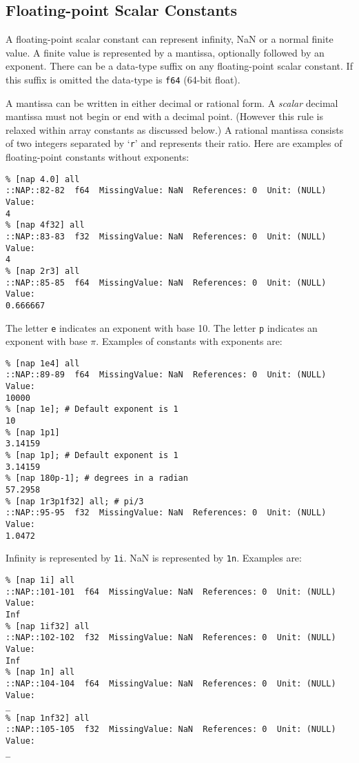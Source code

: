 \subsection{Floating-point Scalar Constants}
      \label{const-Floating-point-Scalar-Constants}

A floating-point scalar constant can represent infinity, NaN or
    a normal finite value. A finite value is represented by a mantissa,
    optionally followed by an exponent. There can be a data-type suffix
    on any floating-point scalar constant. If this suffix is omitted
    the data-type is 
    \texttt{f64} (64-bit float).
    

A mantissa can be written in either decimal or rational form.
    A \emph{scalar} decimal mantissa must not begin or end with a decimal point.
    (However this rule is relaxed within array constants as discussed below.)
    A rational mantissa consists of two integers separated by 
    `\texttt{r}' and represents their ratio. Here are examples of
    floating-point constants without exponents:
    \begin{verbatim}
% [nap 4.0] all
::NAP::82-82  f64  MissingValue: NaN  References: 0  Unit: (NULL)
Value:
4
% [nap 4f32] all
::NAP::83-83  f32  MissingValue: NaN  References: 0  Unit: (NULL)
Value:
4
% [nap 2r3] all
::NAP::85-85  f64  MissingValue: NaN  References: 0  Unit: (NULL)
Value:
0.666667
\end{verbatim}

    

The letter 
    \texttt{e} indicates an exponent with base 10. The letter 
    \texttt{p} indicates an exponent with base $\pi$. Examples of
    constants with exponents are:
    \begin{verbatim}
% [nap 1e4] all
::NAP::89-89  f64  MissingValue: NaN  References: 0  Unit: (NULL)
Value:
10000
% [nap 1e]; # Default exponent is 1
10
% [nap 1p1]
3.14159
% [nap 1p]; # Default exponent is 1
3.14159
% [nap 180p-1]; # degrees in a radian
57.2958
% [nap 1r3p1f32] all; # pi/3
::NAP::95-95  f32  MissingValue: NaN  References: 0  Unit: (NULL)
Value:
1.0472
\end{verbatim}

    

Infinity is represented by 
    \texttt{1i}. NaN is represented by 
    \texttt{1n}. Examples are:
    \begin{verbatim}
% [nap 1i] all
::NAP::101-101  f64  MissingValue: NaN  References: 0  Unit: (NULL)
Value:
Inf
% [nap 1if32] all
::NAP::102-102  f32  MissingValue: NaN  References: 0  Unit: (NULL)
Value:
Inf
% [nap 1n] all
::NAP::104-104  f64  MissingValue: NaN  References: 0  Unit: (NULL)
Value:
_
% [nap 1nf32] all
::NAP::105-105  f32  MissingValue: NaN  References: 0  Unit: (NULL)
Value:
_
\end{verbatim}

